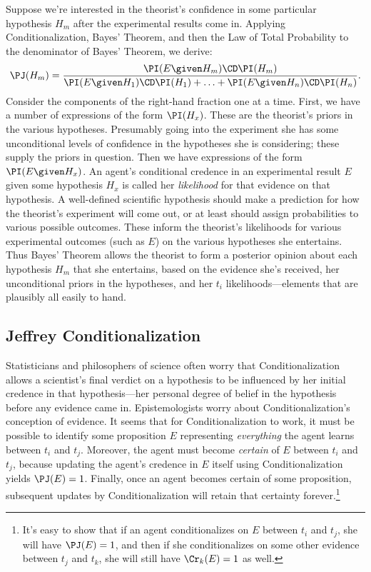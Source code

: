 Suppose we're interested in the theorist's confidence in some particular hypothesis $H_m$ after the experimental results come in. Applying Conditionalization, Bayes' Theorem, and then the Law of Total Probability to the denominator of Bayes' Theorem, we derive:
\begin{equation}
\PJ(H_m)=\frac{\PI(E \given H_m) \CD \PI(H_m)}{\PI(E \given H_1) \CD \PI(H_1) + \ldots + \PI(E \given H_n) \CD \PI(H_n)}.
\end{equation}
Consider the components of the right-hand fraction one at a time. First, we have a number of expressions of the form $\PI(H_x)$. These are the theorist's priors in the various hypotheses. Presumably going into the experiment she has some unconditional levels of confidence in the hypotheses she is considering; these supply the priors in question. Then we have expressions of the form $\PI(E \given H_x)$. An agent's conditional credence in an experimental result $E$ given some hypothesis $H_x$ is called her \textit{likelihood} for that evidence on that hypothesis. A well-defined scientific hypothesis should make a prediction for how the theorist's experiment will come out, or at least should assign probabilities to various possible outcomes. These inform the theorist's likelihoods for various experimental outcomes (such as $E$) on the various hypotheses she entertains. Thus Bayes' Theorem allows the theorist to form a posterior opinion about each hypothesis $H_m$ that she entertains, based on the evidence she's received, her unconditional priors in the hypotheses, and her $t_i$ likelihoods---elements that are plausibly all easily to hand.


\subsection{Jeffrey Conditionalization}  \label{ss:Jeff}
Statisticians and philosophers of science often worry that Conditionalization allows a scientist's final verdict on a hypothesis to be influenced by her initial credence in that hypothesis---her personal degree of belief in the hypothesis before any evidence came in. Epistemologists worry about Conditionalization's conception of evidence. It seems that for Conditionalization to work, it must be possible to identify some proposition $E$ representing \emph{everything} the agent learns between $t_i$ and $t_j$. Moreover, the agent must become \emph{certain} of $E$ between $t_i$ and $t_j$, because updating the agent's credence in $E$ itself using Conditionalization yields $\PJ(E)=1$. Finally, once an agent becomes certain of some proposition, subsequent updates by Conditionalization will retain that certainty forever.\footnote
{It's easy to show that if an agent conditionalizes on $E$ between $t_i$ and $t_j$, she will have $\PJ(E)=1$, and then if she conditionalizes on some other evidence between $t_j$ and $t_k$, she will still have $\Cr_k(E)=1$ as well.}

